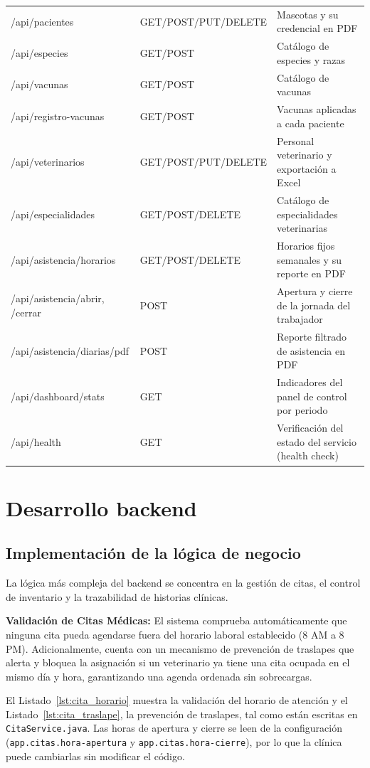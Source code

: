 \documentclass[11pt,a4paper]{report}
\begin{document}
\begin{longtable}{@{}>{\raggedright\arraybackslash}p{4.9cm} >{\raggedright\arraybackslash}p{2.6cm} p{7.5cm}@{}}
/api/pacientes & GET/\allowbreak POST/\allowbreak PUT/\allowbreak DELETE & Mascotas y su credencial en PDF \\
/api/especies & GET/\allowbreak POST & Catálogo de especies y razas \\
/api/vacunas & GET/\allowbreak POST & Catálogo de vacunas \\
/api/registro-vacunas & GET/\allowbreak POST & Vacunas aplicadas a cada paciente \\
/api/veterinarios & GET/\allowbreak POST/\allowbreak PUT/\allowbreak DELETE & Personal veterinario y exportación a Excel \\
/api/especialidades & GET/\allowbreak POST/\allowbreak DELETE & Catálogo de especialidades veterinarias \\
/api/asistencia/horarios & GET/\allowbreak POST/\allowbreak DELETE & Horarios fijos semanales y su reporte en PDF \\
/api/asistencia/abrir, /cerrar & POST & Apertura y cierre de la jornada del trabajador \\
/api/asistencia/diarias/pdf & POST & Reporte filtrado de asistencia en PDF \\
/api/dashboard/stats & GET & Indicadores del panel de control por periodo \\
/api/health & GET & Verificación del estado del servicio (health check) \\
\end{longtable}

\section{Desarrollo backend}
\subsection{Implementación de la lógica de negocio}
La lógica más compleja del backend se concentra en la gestión de citas, el control de inventario y la trazabilidad de historias clínicas.

\textbf{Validación de Citas Médicas:}
El sistema comprueba automáticamente que ninguna cita pueda agendarse fuera del horario laboral establecido (8 AM a 8 PM). Adicionalmente, cuenta con un mecanismo de prevención de traslapes que alerta y bloquea la asignación si un veterinario ya tiene una cita ocupada en el mismo día y hora, garantizando una agenda ordenada sin sobrecargas.

El Listado~\ref{lst:cita_horario} muestra la validación del horario de atención y el Listado~\ref{lst:cita_traslape}, la prevención de traslapes, tal como están escritas en \texttt{CitaService.java}. Las horas de apertura y cierre se leen de la configuración (\texttt{app.citas.hora-apertura} y \texttt{app.citas.hora-cierre}), por lo que la clínica puede cambiarlas sin modificar el código.
\end{document}
